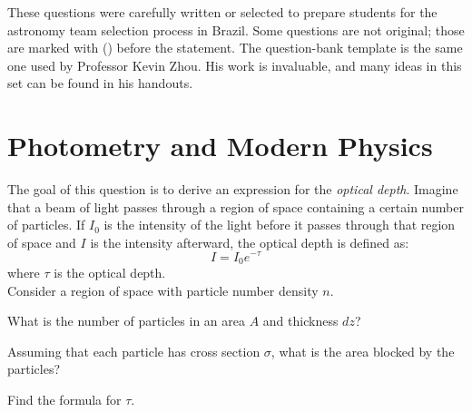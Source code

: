 \documentclass[11pt]{article}
\begin{document}

These questions were carefully written or selected to prepare students for the astronomy team selection process in Brazil. Some questions are not original; those are marked with () before the statement. The question-bank template is the same one used by Professor Kevin Zhou. His work is invaluable, and many ideas in this set can be found in his handouts.




\section{Photometry and Modern Physics}

\begin{pproblem}
    The goal of this question is to derive an expression for the \textit{optical depth}. Imagine that a beam of light passes through a region of space containing a certain number of particles. If \(I_0\) is the intensity of the light before it passes through that region of space and \(I\) is the intensity afterward, the optical depth is defined as:
    \[I = I_0e^{-\tau}\]
    where \(\tau\) is the optical depth.
    \\
    Consider a region of space with particle number density \(n\).
    \begin{alternativas}
        \item What is the number of particles in an area \(A\) and thickness \(dz\)?
        \item Assuming that each particle has cross section \(\sigma\), what is the area blocked by the particles?
        \item Find the formula for \(\tau\). 
    \end{alternativas}

\end{pproblem}
\end{document}

